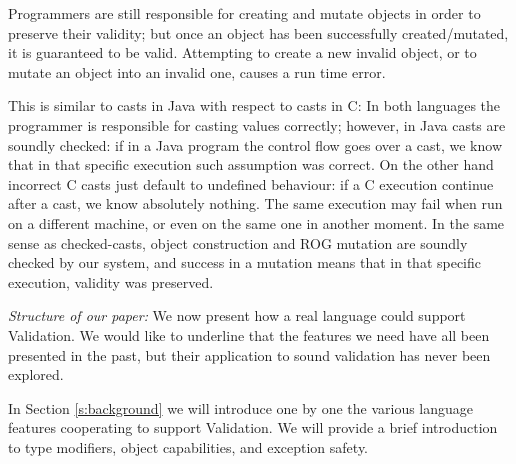 Programmers are still responsible for creating and mutate objects in order to preserve their validity;
but once an object has been successfully created/mutated, it is guaranteed to be valid.
Attempting to create a new invalid object, or to mutate an object into an invalid one, causes
a run time error.

This is similar to casts in Java with respect to casts in C:
In both languages the programmer is responsible for casting values correctly;
however, in Java casts are soundly checked: if in a Java program the control flow goes over a cast,
we know that in that specific
execution such assumption was correct.
On the other hand incorrect C casts just default to undefined behaviour:
if a C execution continue after a cast, we know absolutely nothing. The same execution
may fail when run on a different machine, 
or even on the same one in another moment.
In the same sense as checked-casts, object construction and ROG mutation are soundly checked by our system,
and success in a mutation means that in that specific execution, validity was preserved.




%
%  
% 
%
%
%
%
%
%
%
%
%
%
%
%
%
%
%
%
%



\noindent\textit{Structure of our paper:} We now present how a real language could support
Validation. 
We would like to underline that the
features we need have all been presented in the past, but their application to sound validation has never been explored.

In Section \ref{s:background} we will introduce one by one the various
language features cooperating
to support Validation. %
We will provide a brief introduction to type modifiers, object capabilities, and exception safety.

